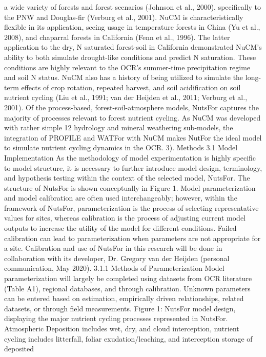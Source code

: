 \documentclass{article}
\begin{document}
a wide variety of forests and forest scenarios (Johnson et al., 2000), specifically to the PNW and
Douglas-fir (Verburg et al., 2001). NuCM is characteristically flexible in its application, seeing
usage in temperature forests in China (Yu et al., 2008), and chaparral forests in California (Fenn
et al., 1996). The latter application to the dry, N saturated forest-soil in California demonstrated
NuCM’s ability to both simulate drought-like conditions and predict N saturation. These
conditions are highly relevant to the OCR’s summer-time precipitation regime and soil N status.
NuCM also has a history of being utilized to simulate the long-term effects of crop rotation,
repeated harvest, and soil acidification on soil nutrient cycling (Liu et al., 1991; van der Heijden
et al., 2011; Verburg et al., 2001).
Of the process-based, forest-soil-atmosphere models, NutsFor captures the majority of
processes relevant to forest nutrient cycling. As NuCM was developed with rather simple 
12
hydrology and mineral weathering sub-models, the integration of PROFILE and WATFor with
NuCM makes NutFor the ideal model to simulate nutrient cycling dynamics in the OCR.
3). Methods
3.1 Model Implementation
As the methodology of model experimentation is highly specific to model structure, it is
necessary to further introduce model design, terminology, and hypothesis testing within the
context of the selected model, NutsFor. The structure of NutsFor is shown conceptually in Figure
1. Model parameterization and model calibration are often used interchangeably; however,
within the framework of NutsFor, parameterization is the process of selecting representative
values for sites, whereas calibration is the process of adjusting current model outputs to increase
the utility of the model for different conditions. Failed calibration can lead to parameterization
when parameters are not appropriate for a site. Calibration and use of NutsFor in this research
will be done in collaboration with its developer, Dr. Gregory van der Heijden (personal
communication, May 2020).
3.1.1 Methods of Parameterization
Model parameterization will largely be completed using datasets from OCR literature (Table
A1), regional databases, and through calibration. Unknown parameters can be entered based on
estimation, empirically driven relationships, related datasets, or through field measurements.
Figure 1: NutsFor model design, displaying the major nutrient cycling processes represented
in NutsFor. Atmospheric Deposition includes wet, dry, and cloud interception, nutrient
cycling includes litterfall, foliar exudation/leaching, and interception storage of deposited
\end{document}
